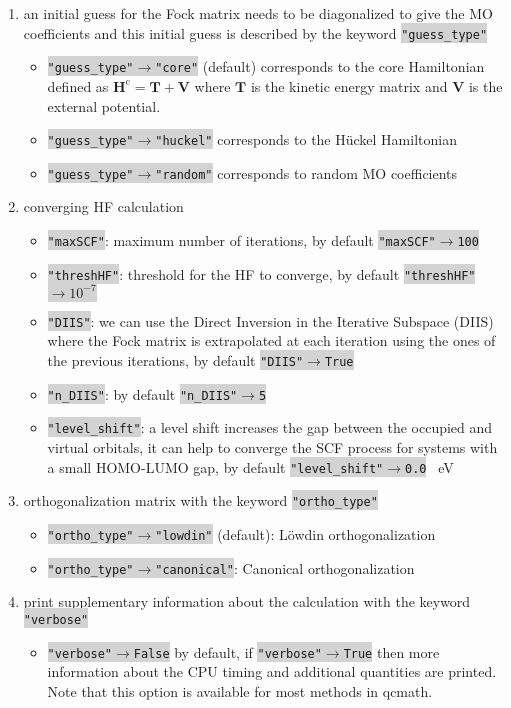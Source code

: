 \documentclass[aip,jcp,reprint,noshowkeys,superscriptaddress]{revtex4-1}
\newcommand{\HcMat}{\bm{H}^\text{c}}
\newcommand{\TMat}{\bm{T}}
\newcommand{\VMat}{\bm{V}}
\newcommand{\keyword}[1]{{\colorbox{lightgray}{\texttt{#1}}}}
\begin{document}
\begin{enumerate}
\item an initial guess for the Fock matrix needs to be diagonalized to give the MO coefficients and this initial guess is described by the keyword \keyword{"guess\_type"}
\begin{itemize}
\item \keyword{"guess\_type"$\rightarrow$"core"} (default) corresponds to the core Hamiltonian defined as $\HcMat = \TMat + \VMat$ where $\TMat$ is the kinetic energy matrix and $\VMat$ is the external potential.
\item \keyword{"guess\_type"$\rightarrow$"huckel"}  corresponds to the H\"uckel Hamiltonian 
\item \keyword{"guess\_type"$\rightarrow$"random"}  corresponds to random MO coefficients
\end{itemize}
\item converging HF calculation
\begin{itemize}
\item \keyword{"maxSCF"}: maximum number of iterations, by default \keyword{"maxSCF"$\rightarrow$100}
\item \keyword{"threshHF"}: threshold for the HF to converge, by default \keyword{"threshHF"$\rightarrow10^{-7}$}
\item \keyword{"DIIS"}: we can use the Direct Inversion in the Iterative Subspace (DIIS) where the Fock matrix is extrapolated at each iteration using the ones of the previous iterations, by default \keyword{"DIIS"$\rightarrow$True}
\item \keyword{"n\_DIIS"}: by default \keyword{"n\_DIIS"$\rightarrow$5}
\item \keyword{"level\_shift"}: a level shift increases the gap between the occupied and virtual orbitals, it can help to converge the SCF process for systems with a small HOMO-LUMO gap, by default \keyword{"level\_shift"$\rightarrow$0.0} \SI{}{eV}
\end{itemize}
\item orthogonalization matrix with the keyword \keyword{"ortho\_type"}
\begin{itemize}
\item  \keyword{"ortho\_type"$\rightarrow$"lowdin"} (default): L\"owdin orthogonalization 
\item  \keyword{"ortho\_type"$\rightarrow$"canonical"}: Canonical orthogonalization 
\end{itemize}
\item print supplementary information about the calculation with the keyword \keyword{"verbose"}
\begin{itemize}
\item \keyword{"verbose"$\rightarrow$False} by default, if \keyword{"verbose"$\rightarrow$True} then more information about the CPU timing and additional quantities are printed. Note that this option is available for most methods in qcmath.
\end{itemize}
\end{enumerate}
\end{document}
